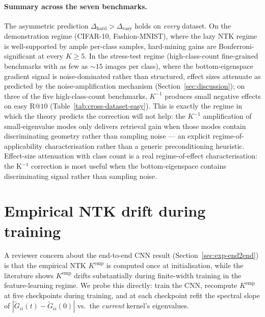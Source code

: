 \documentclass{article}
\newcommand{\Gtilde}{\widetilde{G}}
\begin{document}
\paragraph{Summary across the seven benchmarks.}
The asymmetric prediction
$\Delta_{\mathrm{hard}}\!>\!\Delta_{\mathrm{easy}}$ holds on
\emph{every} dataset. On the demonstration regime (CIFAR-10,
Fashion-MNIST), where the lazy NTK regime is well-supported by
ample per-class samples, hard-mining gains are
Bonferroni-significant at every $K\!\geq\!5$. In the stress-test
regime (high-class-count fine-grained benchmarks with as few as
${\sim}15$ images per class), where the bottom-eigenspace gradient
signal is noise-dominated rather than structured, effect sizes
attenuate as predicted by the noise-amplification mechanism
(Section~\ref{sec:discussion}); on three of the five high-class-count
benchmarks, $K^{-1}$ produces small negative effects on easy R@$10$
(Table~\ref{tab:cross-dataset-easy}). This is exactly the regime in
which the theory predicts the correction will not help: the
$K^{-1}$ amplification of small-eigenvalue modes only delivers
retrieval gain when those modes contain discriminating geometry
rather than sampling noise --- an explicit
regime-of-applicability characterisation rather than a generic
preconditioning heuristic. Effect-size attenuation with class count is a
real regime-of-effect characterisation: the K$^{-1}$ correction is
most useful when the bottom-eigenspace contains discriminating signal
rather than sampling noise.

\section{Empirical NTK drift during training}
\label{app:drift}

A reviewer concern about the end-to-end CNN result
(Section~\ref{sec:exp-end2end}) is that the empirical NTK
$K^{\mathrm{emp}}$ is computed once at initialisation, while the
literature shows $K^{\mathrm{emp}}$ drifts substantially during
finite-width training in the feature-learning regime. We probe this
directly: train the CNN, recompute $K^{\mathrm{emp}}$ at five
checkpoints during training, and at each checkpoint refit the
spectral slope of $|\Gtilde_{ii}(t) - \Gtilde_{ii}(0)|$ vs.\ the
\emph{current} kernel's eigenvalues.
\end{document}
